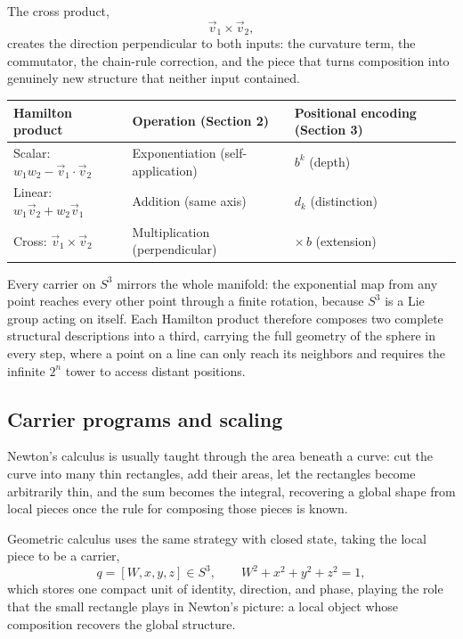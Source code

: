 \documentclass[12pt]{article}
\begin{document}
The cross product,
\[
    \vec{v}_1 \times \vec{v}_2,
\]
creates the direction perpendicular to both inputs: the curvature term, the commutator, the chain-rule correction, and the piece that turns composition into genuinely new structure that neither input contained.

\begin{center}
\begin{tabular}{l l l}
    \toprule
    Hamilton product & Operation (Section 2) & Positional encoding (Section 3) \\
    \midrule
    Scalar: $w_1 w_2 - \vec{v}_1 \cdot \vec{v}_2$ & Exponentiation (self-application) & $b^k$ (depth) \\
    Linear: $w_1 \vec{v}_2 + w_2 \vec{v}_1$ & Addition (same axis) & $d_k$ (distinction) \\
    Cross: $\vec{v}_1 \times \vec{v}_2$ & Multiplication (perpendicular) & $\times\, b$ (extension) \\
    \bottomrule
\end{tabular}
\end{center}

Every carrier on $S^3$ mirrors the whole manifold: the exponential map from any point reaches every other point through a finite rotation, because $S^3$ is a Lie group acting on itself. Each Hamilton product therefore composes two complete structural descriptions into a third, carrying the full geometry of the sphere in every step, where a point on a line can only reach its neighbors and requires the infinite $2^n$ tower to access distant positions.

\subsection{Carrier programs and scaling}

Newton's calculus is usually taught through the area beneath a curve: cut the curve into many thin rectangles, add their areas, let the rectangles become arbitrarily thin, and the sum becomes the integral, recovering a global shape from local pieces once the rule for composing those pieces is known.

Geometric calculus uses the same strategy with closed state, taking the local piece to be a carrier,
\[
    q=[W,x,y,z]\in S^3,
    \qquad
    W^2+x^2+y^2+z^2=1,
\]
which stores one compact unit of identity, direction, and phase, playing the role that the small rectangle plays in Newton's picture: a local object whose composition recovers the global structure.
\end{document}
